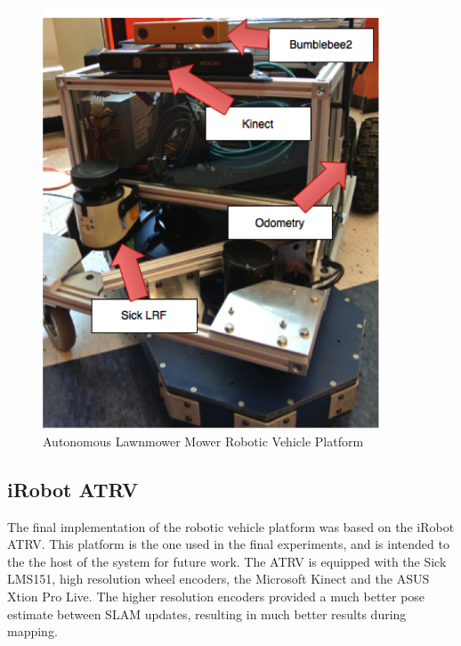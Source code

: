 \documentclass[12pt]{report}
\begin{document}
\begin{figure}[ht]
  \centering
  \includegraphics[width=4in,keepaspectratio]{lawnmower.png}
  \caption{Autonomous Lawnmower Mower Robotic Vehicle Platform}
  \label{fig:lawnmower}
\end{figure}

\subsection{iRobot ATRV}
The final implementation of the robotic vehicle platform was based on the iRobot ATRV.  This platform is the one used in the final experiments, and is intended to the the host of the system for future work.  The ATRV is equipped with the Sick LMS151, high resolution wheel encoders, the Microsoft Kinect and the ASUS Xtion Pro Live.  The higher resolution encoders provided a much better pose estimate between SLAM updates, resulting in much better results during mapping.
\end{document}
